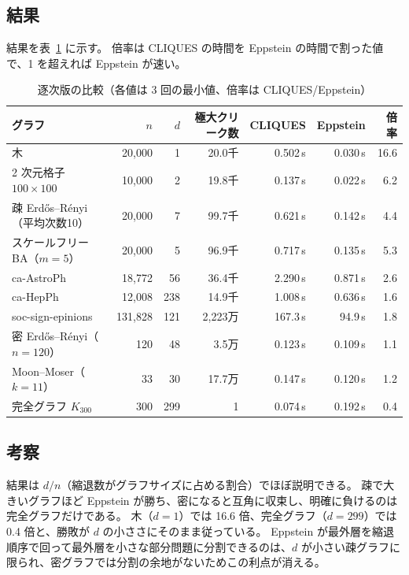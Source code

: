 \subsection{結果}

結果を表~\ref{tab:seq-compare} に示す。
倍率は CLIQUES の時間を Eppstein の時間で割った値で、1 を超えれば Eppstein が速い。

\begin{table}[htbp]
  \centering
  \caption{逐次版の比較（各値は 3 回の最小値、倍率は CLIQUES/Eppstein）}
  \label{tab:seq-compare}
  \begin{tabular}{lrrrrrr}
    \toprule
    グラフ & $n$ & $d$ & 極大クリーク数 & CLIQUES & Eppstein & 倍率 \\
    \midrule
    木                       & 20{,}000  & 1   & 20.0千   & 0.502\,s & 0.030\,s & 16.6 \\
    2 次元格子 $100\times100$ & 10{,}000  & 2   & 19.8千   & 0.137\,s & 0.022\,s & 6.2 \\
    疎 Erdős–Rényi（平均次数10）& 20{,}000 & 7   & 99.7千   & 0.621\,s & 0.142\,s & 4.4 \\
    スケールフリー BA（$m{=}5$） & 20{,}000 & 5   & 96.9千   & 0.717\,s & 0.135\,s & 5.3 \\
    ca-AstroPh               & 18{,}772  & 56  & 36.4千   & 2.290\,s & 0.871\,s & 2.6 \\
    ca-HepPh                 & 12{,}008  & 238 & 14.9千   & 1.008\,s & 0.636\,s & 1.6 \\
    soc-sign-epinions        & 131{,}828 & 121 & 2{,}223万 & 167.3\,s & 94.9\,s & 1.8 \\
    密 Erdős–Rényi（$n{=}120$）& 120      & 48  & 3.5万    & 0.123\,s & 0.109\,s & 1.1 \\
    Moon–Moser（$k{=}11$）    & 33        & 30  & 17.7万   & 0.147\,s & 0.120\,s & 1.2 \\
    完全グラフ $K_{300}$      & 300       & 299 & 1       & 0.074\,s & 0.192\,s & 0.4 \\
    \bottomrule
  \end{tabular}
\end{table}

\subsection{考察}

結果は $d/n$（縮退数がグラフサイズに占める割合）でほぼ説明できる。
疎で大きいグラフほど Eppstein が勝ち、密になると互角に収束し、明確に負けるのは完全グラフだけである。
木（$d{=}1$）では 16.6 倍、完全グラフ（$d{=}299$）では 0.4 倍と、勝敗が $d$ の小ささにそのまま従っている。
Eppstein が最外層を縮退順序で回って最外層を小さな部分問題に分割できるのは、$d$ が小さい疎グラフに限られ、密グラフでは分割の余地がないためこの利点が消える。

